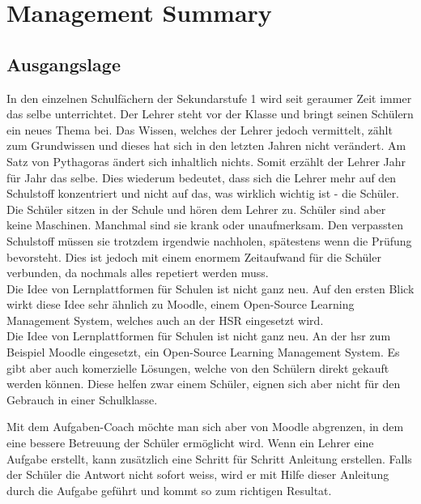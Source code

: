 \section*{Management Summary}

\subsection*{Ausgangslage}
In den einzelnen Schulfächern der Sekundarstufe 1 wird seit geraumer Zeit immer das selbe unterrichtet. Der Lehrer steht vor der Klasse und bringt seinen Schülern ein neues Thema bei. Das Wissen, welches der Lehrer jedoch vermittelt, zählt zum Grundwissen und dieses hat sich in den letzten Jahren nicht verändert. Am Satz von Pythagoras ändert sich inhaltlich nichts. Somit erzählt der Lehrer Jahr für Jahr das selbe. Dies wiederum bedeutet, dass sich die Lehrer mehr auf den Schulstoff konzentriert und nicht auf das, was wirklich wichtig ist - die Schüler. \\

Die Schüler sitzen in der Schule und hören dem Lehrer zu. Schüler sind aber keine Maschinen. Manchmal sind sie krank oder unaufmerksam. Den verpassten Schulstoff müssen sie trotzdem irgendwie nachholen, spätestens wenn die Prüfung bevorsteht. Dies ist jedoch mit einem enormem Zeitaufwand für die Schüler verbunden, da nochmals alles repetiert werden muss. \\

Die Idee von Lernplattformen für Schulen ist nicht ganz neu. Auf den ersten Blick wirkt diese Idee sehr ähnlich zu Moodle, einem Open-Source Learning Management System, welches auch an der HSR eingesetzt wird. \\

Die Idee von Lernplattformen für Schulen ist nicht ganz neu. An der \gls{hsr} zum Beispiel Moodle eingesetzt, ein Open-Source Learning Management System. Es gibt aber auch komerzielle Lösungen, welche von den Schülern direkt gekauft werden können. Diese helfen zwar einem Schüler, eignen sich aber nicht für den Gebrauch in einer Schulklasse. 

Mit dem Aufgaben-Coach möchte man sich aber von Moodle abgrenzen, in dem eine bessere Betreuung der Schüler ermöglicht wird. Wenn ein Lehrer eine Aufgabe erstellt, kann zusätzlich eine Schritt für Schritt Anleitung erstellen. Falls der Schüler die Antwort nicht sofort weiss, wird er mit Hilfe dieser Anleitung durch die Aufgabe geführt und kommt so zum richtigen Resultat. 

